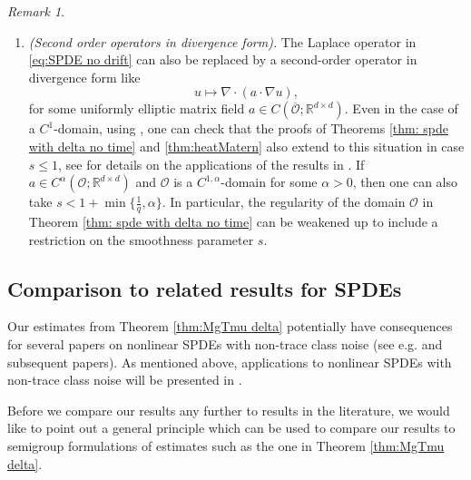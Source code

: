 \documentclass[reqno]{amsart}
\theoremstyle{plain}
\theoremstyle{remark}
\newtheorem{remark}[theorem]{Remark}
\theoremstyle{plain}
\numberwithin{equation}{section}
\newcommand\cO{\mathcal{O}}
\def\R{{\mathbb R}}
\newcommand{\1}{\one}
\begin{document}
\begin{remark}
\begin{enumerate}[\rm (1)]
       \item\label{it:generalization_SPDE2} \emph{(Second order operators in divergence form).}
       The Laplace operator in \eqref{eq:SPDE no drift} can also be replaced by a second-order operator in divergence form like $$u\mapsto \nabla \cdot (a\cdot \nabla u),$$ 
       for some uniformly elliptic matrix field $a\in C(\overline{\cO};\R^{d\times d})$. 
       Even in the case of a $C^1$-domain, using 
\cite[Theorem 11.5]{DivH}, one can check that the proofs of Theorems \ref{thm: spde with delta no time} and \ref{thm:heatMatern} also extend to this situation in case $s\leq 1$, see \cite[Lemma 5.4]{Hornung} for details on the applications of the results in \cite{DivH}. If $a\in C^{\alpha}(\cO;\R^{d\times d})$ and $\cO$ is a $C^{1,\alpha}$-domain for some $\alpha>0$, then one can also take $s<1+\min\{\frac{1}{q},\alpha\}$. 
In particular, the regularity of the domain $\cO$ in Theorem \ref{thm: spde with delta no time} can be weakened up to include a restriction on the smoothness parameter $s$.
\end{enumerate}
\end{remark}




\subsection{Comparison to related results for SPDEs}
\label{subsection SPDE comparison}
Our estimates from Theorem \ref{thm:MgTmu delta} potentially have consequences for several papers on nonlinear SPDEs with non-trace class noise (see e.g. \cite{C03,cerrai2003large, SchnVerdamp, SchnVerbdr} and subsequent papers). As mentioned above, applications to nonlinear SPDEs with non-trace class noise will be presented in \cite{AGVlocal}. 

\smallskip

Before we compare our results any further to results in the literature, we would like to point out a general principle which can be used to compare our results to semigroup formulations of estimates such as the one in Theorem \ref{thm:MgTmu delta}. 
\end{document}
